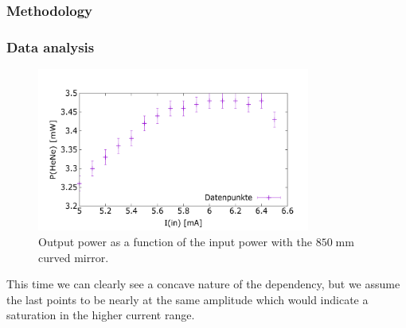 \documentclass[../main.tex]{subfiles}
\begin{document}
\subsubsection*{Methodology}
\subsubsection*{Data analysis}

    \begin{figure}[H]
        \centering
        \includegraphics[width=0.8\textwidth]{Bilddateien/6/P(HeNe)overI(in).png}
        \caption{Output power as a function of the input power with the $850\;\si{\mm}$ curved mirror.}
        \label{fig:output_power_over_input_power_curved}
    \end{figure}

    This time we can clearly see a concave nature of the dependency, but we assume the last points to be nearly at the same amplitude which would indicate a saturation in the higher current range. 
\end{document}
